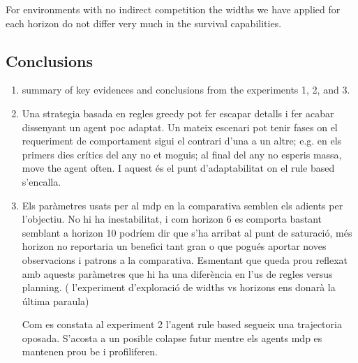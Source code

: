 \documentclass[11pt,oneside,a4paper,openright]{report}
\begin{document}

For environments with no indirect competition the widths we have applied for each horizon do not differ very much in the survival capabilities.


\subsection{Conclusions}

\begin{enumerate}

	\item summary of key evidences and conclusions from the experiments 1, 2, and 3.

	\item Una strategia basada en regles greedy pot fer escapar detalls i fer acabar dissenyant un agent poc adaptat.
	Un mateix escenari pot tenir fases on el requeriment de comportament sigui el contrari d'una a un altre; e.g. en els primers 
	dies crítics del any no et moguis; al final del any no esperis massa, move the agent often. 
	I aquest és el punt d'adaptabilitat on el rule based s'encalla.
	
	\item Els paràmetres usats per al mdp en la comparativa semblen els adients per l'objectiu. No hi ha inestabilitat, 
	i com horizon 6 es comporta bastant semblant a horizon 10 podríem dir que s'ha arribat al punt de saturació,
	més horizon no reportaria un benefici tant gran o que pogués aportar noves observacions i patrons a la 
	comparativa. Esmentant que queda prou reflexat amb aquests paràmetres que hi ha una diferència en l'us de regles versus 
	planning. ( l'experiment d'exploració de widths vs horizons ens donarà la última paraula)

Com es constata al experiment 2 l'agent rule based segueix una trajectoria oposada. S'acosta a un posible 
colapse futur mentre els agents mdp es mantenen prou be i profiliferen.


\end{enumerate}
\end{document}
